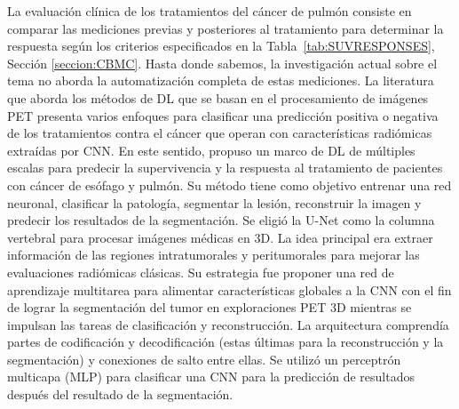 \documentclass[11pt,a4paper,openany]{article}
\begin{document}
        La evaluación clínica de los tratamientos del cáncer de pulmón consiste en comparar las mediciones previas y posteriores al tratamiento para determinar la respuesta según los criterios especificados en la Tabla~\ref{tab:SUVRESPONSES}, Sección \ref{seccion:CBMC}. Hasta donde sabemos, la investigación actual sobre el tema no aborda la automatización completa de estas mediciones. La literatura que aborda los métodos de DL que se basan en el procesamiento de imágenes PET presenta varios enfoques para clasificar una predicción positiva o negativa de los tratamientos contra el cáncer que operan con características radiómicas extraídas por CNN. En este sentido, \cite{Amyar2022} propuso un marco de DL de múltiples escalas para predecir la supervivencia y la respuesta al tratamiento de pacientes con cáncer de esófago y pulmón. Su método tiene como objetivo entrenar una red neuronal, clasificar la patología, segmentar la lesión, reconstruir la imagen y predecir los resultados de la segmentación. Se eligió la U-Net como la columna vertebral para procesar imágenes médicas en 3D. La idea principal era extraer información de las regiones intratumorales y peritumorales para mejorar las evaluaciones radiómicas clásicas. Su estrategia fue proponer una red de aprendizaje multitarea para alimentar características globales a la CNN con el fin de lograr la segmentación del tumor en exploraciones PET 3D mientras se impulsan las tareas de clasificación y reconstrucción. La arquitectura comprendía partes de codificación y decodificación (estas últimas para la reconstrucción y la segmentación) y conexiones de salto entre ellas. Se utilizó un perceptrón multicapa (MLP) para clasificar una CNN para la predicción de resultados después del resultado de la segmentación. \\
\end{document}
